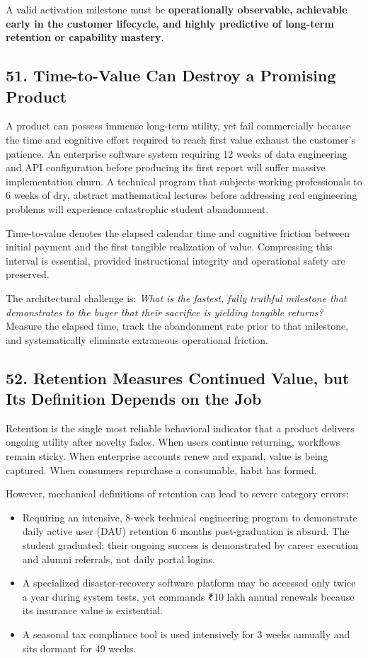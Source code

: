 A valid activation milestone must be \textbf{operationally observable, achievable early in the customer lifecycle, and highly predictive of long-term retention or capability mastery}.

\subsection*{51. Time-to-Value Can Destroy a Promising Product}

A product can possess immense long-term utility, yet fail commercially because the time and cognitive effort required to reach first value exhaust the customer's patience. An enterprise software system requiring 12 weeks of data engineering and API configuration before producing its first report will suffer massive implementation churn. A technical program that subjects working professionals to 6 weeks of dry, abstract mathematical lectures before addressing real engineering problems will experience catastrophic student abandonment.

Time-to-value denotes the elapsed calendar time and cognitive friction between initial payment and the first tangible realization of value. Compressing this interval is essential, provided instructional integrity and operational safety are preserved.

The architectural challenge is: \emph{What is the fastest, fully truthful milestone that demonstrates to the buyer that their sacrifice is yielding tangible returns?} Measure the elapsed time, track the abandonment rate prior to that milestone, and systematically eliminate extraneous operational friction.

\subsection*{52. Retention Measures Continued Value, but Its Definition Depends on the Job}

Retention is the single most reliable behavioral indicator that a product delivers ongoing utility after novelty fades. When users continue returning, workflows remain sticky. When enterprise accounts renew and expand, value is being captured. When consumers repurchase a consumable, habit has formed.

However, mechanical definitions of retention can lead to severe category errors:
\begin{itemize}
    \item Requiring an intensive, 8-week technical engineering program to demonstrate daily active user (DAU) retention 6 months post-graduation is absurd. The student graduated; their ongoing success is demonstrated by career execution and alumni referrals, not daily portal logins.
    \item A specialized disaster-recovery software platform may be accessed only twice a year during system tests, yet commands ₹10 lakh annual renewals because its insurance value is existential.
    \item A seasonal tax compliance tool is used intensively for 3 weeks annually and sits dormant for 49 weeks.
\end{itemize}

